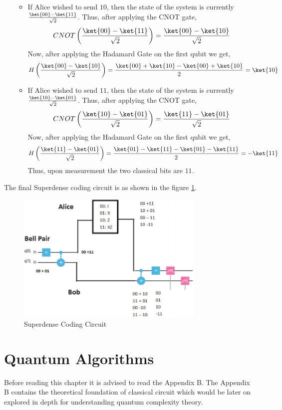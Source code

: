 \documentclass[12pt, oneside]{book}
\theoremstyle{definition}
\theoremstyle{definition}
\theoremstyle{remark}
\begin{document}
\begin{enumerate}
\begin{itemize}
\[        \]
        \item If Alice wished to send $10$, then the state of the system is currently $\frac{\ket{00}-\ket{11}}{\sqrt{2}}$. Thus, after applying the CNOT gate,
        \[
            CNOT\left(\frac{\ket{00}-\ket{11}}{\sqrt{2}}\right)=\frac{\ket{00}-\ket{10}}{\sqrt{2}}
        \]
        Now, after applying the Hadamard Gate on the first qubit we get,
        \[
            H\left(\frac{\ket{00}-\ket{10}}{\sqrt{2}}\right)=\frac{\ket{00}+\ket{10}-\ket{00}+\ket{10}}{2}=\ket{10}
        \]
        \item If Alice wished to send $11$, then the state of the system is currently $\frac{\ket{10}-\ket{01}}{\sqrt{2}}$. Thus, after applying the CNOT gate,
        \[
            CNOT\left(\frac{\ket{10}-\ket{01}}{\sqrt{2}}\right)=\frac{\ket{11}-\ket{01}}{\sqrt{2}}
        \]
        Now, after applying the Hadamard Gate on the first qubit we get,
        \[
            H\left(\frac{\ket{11}-\ket{01}}{\sqrt{2}}\right)=\frac{\ket{01}-\ket{11}-\ket{01}-\ket{11}}{2}=-\ket{11}
        \]
        Thus, upon measurement the two classical bits are $11$.
    \end{itemize}
\end{enumerate}

The final Superdense coding circuit is as shown in the figure \ref{fig:superdense-coding}.
\begin{figure}[H]
    \centering
    \includegraphics[width=0.8\textwidth]{../images/superdense-coding4.png}
    \caption{Superdense Coding Circuit}
    \label{fig:superdense-coding}
\end{figure}
 
\newpage

\chapter{Quantum Algorithms}
Before reading this chapter it is advised to read the Appendix B. The Appendix B contains the theoretical foundation of classical circuit which would be later on explored in depth for understanding quantum complexity theory.
\end{document}
